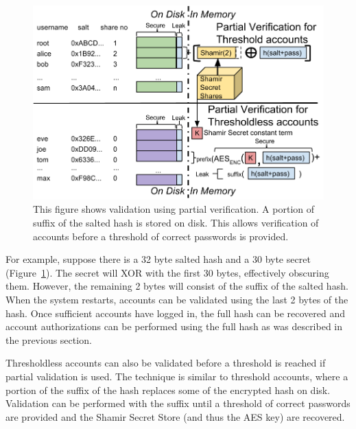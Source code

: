 \begin{figure}[t]
\center
\includegraphics[width=1.05\columnwidth]{figures/partialverification.png}
\caption{This figure shows validation using partial verification.
A portion of suffix of the salted hash is stored on disk.  This
allows verification of accounts before a threshold of correct passwords is
provided.
}
\label{fig-partialverification}
\end{figure}

For example, suppose there is a 32 byte salted hash and a 30 byte 
secret (Figure~\ref{fig-partialverification}).   The secret will XOR with
the first 30 bytes, effectively obscuring them.   However, the remaining
2 bytes will consist of the suffix of the salted hash.   When the
system restarts, accounts can be validated using the last 2 bytes of the
hash.   Once sufficient accounts have logged in, the full
hash can be recovered and account authorizations can be 
performed using the full hash as was described in the 
previous section.

Thresholdless accounts can also be validated before a threshold is reached
if partial validation is used.   The technique is similar to threshold 
accounts, where a portion of the suffix of the hash replaces
some of the encrypted hash on disk.   Validation can be 
performed with the suffix until a threshold of correct passwords are provided
and the Shamir Secret Store (and thus the AES key) are recovered.

